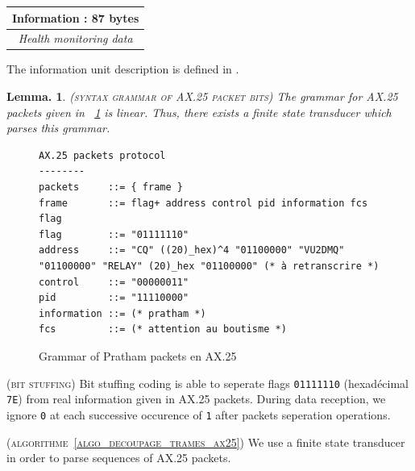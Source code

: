 \documentclass[a4paper]{report}
\newtheorem{lemma}[theorem]{Lemma.}
\newenvironment{implementation}[1][Implementation.]{\begin{trivlist}
\item[\hskip \labelsep {\bfseries #1}]}{\end{trivlist}}
\newenvironment{definition}[1][Definition.]{\begin{trivlist}
\item[\hskip \labelsep {\bfseries #1}]}{\end{trivlist}}
\newenvironment{remark}[1][Remark.]{\begin{trivlist}
\item[\hskip \labelsep {\bfseries #1}]}{\end{trivlist}}
\begin{document}
\begin{definition}
\begin{center}
  \begin{footnotesize}
    \begin{tabular}{|c|}
      \hline
      Information : 87 bytes\\
      \hline
      \textit{Health monitoring data}\cite{IITB}\\
      \hline
    \end{tabular}
  \end{footnotesize}
\end{center}

\end{definition}

The information unit description is defined in \cite{IITB}.


\begin{lemma}
  (\textsc{syntax grammar of AX.25 packet bits})
  The grammar for AX.25 packets given in ~\ref{fig:EBNF_ax25} is linear. Thus, there exists a finite state transducer which parses this grammar.
\end{lemma}

\begin{figure}
{\scriptsize
\begin{verbatim}
AX.25 packets protocol
--------
packets     ::= { frame }
frame       ::= flag+ address control pid information fcs flag
flag        ::= "01111110"
address     ::= "CQ" ((20)_hex)^4 "01100000" "VU2DMQ" "01100000" "RELAY" (20)_hex "01100000" (* à retranscrire *)
control     ::= "00000011"
pid         ::= "11110000"
information ::= (* pratham *)
fcs         ::= (* attention au boutisme *)
\end{verbatim}
}
\caption{Grammar of Pratham packets en AX.25}
\label{fig:EBNF_ax25}
\end{figure}

\begin{remark}
  \textsc{(bit stuffing)}
  Bit stuffing coding is able to seperate flags \texttt{01111110} (hexad\'ecimal \texttt{7E}) from real information given in AX.25 packets\cite{IITB}. During data reception, we ignore \texttt{0} at each successive occurence of \texttt{1} after packets seperation operations.
\end{remark}


\begin{implementation}
  (\textsc{algorithme~\ref{algo_decoupage_trames_ax25}})
  { \color{rltred}{\Radioactivity} }
  We use a finite state transducer in order to parse sequences of AX.25 packets.
\end{implementation}
\end{document}
